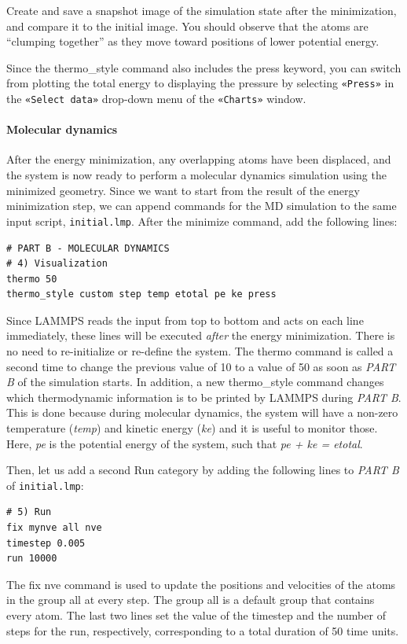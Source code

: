 \documentclass[9pt,tutorial]{livecoms}
\newcommand{\lmpcmd}[1]{\hspace{0pt}\colorbox{listing}{\textcolor{command}{\small{#1}}}\hspace{0pt}} %
\newcommand{\flecmd}[1]{\textcolor{command}{\texttt{#1}}} %
\newcommand{\guicmd}[1]{\textcolor{command}{\texttt{«#1»}}} %
\begin{document}
Create and save a snapshot image of the simulation state after the
minimization, and compare it to the initial image.  You should observe
that the atoms are ``clumping together'' as they move toward positions
of lower potential energy.

\begin{note}
Since the \lmpcmd{thermo\_style} command also includes the \lmpcmd{press}
keyword, you can switch from plotting the total energy to
displaying the pressure by selecting \guicmd{Press} in the \guicmd{Select data}
drop-down menu of the \guicmd{Charts} window.
\end{note}

\paragraph{Molecular dynamics}

After the energy minimization, any overlapping atoms have been
displaced, and the system is now ready to perform a molecular dynamics
simulation using the minimized geometry.  Since we want to start from
the result of the energy minimization step, we can append commands for
the MD simulation to the same input script, \flecmd{initial.lmp}.  After
the \lmpcmd{minimize} command, add the following lines:
\begin{lstlisting}
# PART B - MOLECULAR DYNAMICS
# 4) Visualization
thermo 50
thermo_style custom step temp etotal pe ke press
\end{lstlisting}

Since LAMMPS reads the input from top to bottom and acts on each line
immediately, these lines will be executed \emph{after} the energy
minimization.  There is no need to re-initialize or re-define the
system.  The \lmpcmd{thermo} command is called a second time to change
the previous value of 10 to a value of 50 as soon as \textit{PART B} of
the simulation starts.  In addition, a new \lmpcmd{thermo\_style}
command changes which thermodynamic information is to be printed by LAMMPS
during \textit{PART B}.  This is done because during molecular
dynamics, the system will have a non-zero temperature (\textit{temp})
and kinetic energy (\textit{ke}) and it is useful to monitor those.
Here, \textit{pe} is the potential energy of the system, such that
\textit{pe + ke = etotal}.

Then, let us add a second \lmpcmd{Run} category by adding the following
lines to \emph{PART B} of \flecmd{initial.lmp}:
\begin{lstlisting}
# 5) Run
fix mynve all nve
timestep 0.005
run 10000
\end{lstlisting}
The \lmpcmd{fix nve} command is used to update the positions and
velocities of the atoms in the group \lmpcmd{all} at every step.  The
group \lmpcmd{all} is a default group that contains every atom.  The
last two lines set the value of the \lmpcmd{timestep} and the number of
steps for the \lmpcmd{run}, respectively, corresponding to a total
duration of 50 time units.
\end{document}
